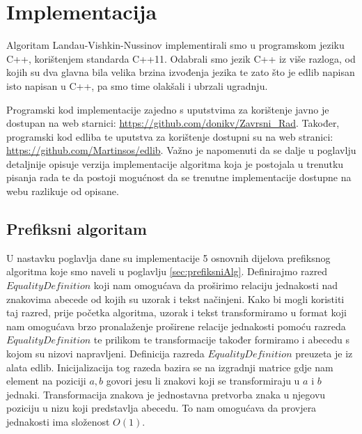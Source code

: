 \documentclass[times, utf8, zavrsni]{fer}
\begin{document}
\chapter{Implementacija}
Algoritam Landau-Vishkin-Nussinov implementirali smo u programskom jeziku C++, korištenjem standarda C++11. Odabrali smo jezik C++ iz više razloga, od kojih su dva glavna bila velika brzina izvođenja jezika te zato što je edlib napisan isto napisan u C++, pa smo time olakšali i ubrzali ugradnju.
\begin{sloppypar}
Programski kod implementacije zajedno s uputstvima za korištenje javno je dostupan na web starnici: \href{https://github.com/donikv/Zavrsni_Rad}{https://github.com/donikv/Zavrsni\_Rad}. Također, programski kod edliba te uputstva za korištenje dostupni su na web stranici: \href{https://github.com/Martinsos/edlib}{https://github.com/Martinsos/edlib}. Važno je napomenuti da se dalje u poglavlju detaljnije opisuje verzija implementacije algoritma koja je postojala u trenutku pisanja rada te da postoji mogućnost da se trenutne implementacije dostupne na webu razlikuje od opisane.
\end{sloppypar}
\section{Prefiksni algoritam}
U nastavku poglavlja dane su implementacije 5 osnovnih dijelova prefiksnog algoritma koje smo naveli u poglavlju \ref{sec:prefiksniAlg}. Definirajmo razred $EqualityDefinition$ koji nam omogućava da proširimo relaciju jednakosti nad znakovima abecede od kojih su uzorak i tekst načinjeni. Kako bi mogli koristiti taj razred, prije početka algoritma, uzorak i tekst transformiramo u format koji nam omogućava brzo pronalaženje proširene relacije jednakosti pomoću razreda $EqualityDefinition$ te prilikom te transformacije također formiramo i abecedu s kojom su nizovi napravljeni. Definicija razreda $EqualityDefinition$ preuzeta je iz alata edlib. Inicijalizacija tog razeda bazira se na izgradnji matrice gdje nam element na poziciji $a,b$ govori jesu li znakovi koji se transformiraju u $a$ i $b$ jednaki. Transformacija znakova je jednostavna pretvorba znaka u njegovu poziciju u nizu koji predstavlja abecedu. To nam omogućava da provjera jednakosti ima složenost $O(1)$. 

 
\end{document}
